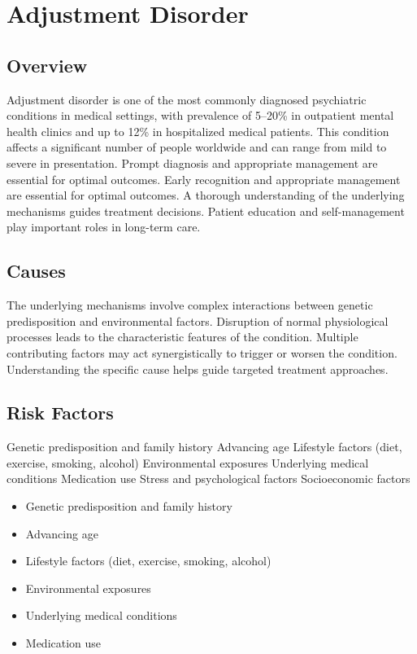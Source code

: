 \chapter{Adjustment Disorder}
\label{sec:Adjustment Disorder}

\section{Overview}
Adjustment disorder is one of the most commonly diagnosed psychiatric conditions in medical settings, with prevalence of 5--20\% in outpatient mental health clinics and up to 12\% in hospitalized medical patients. This condition affects a significant number of people worldwide and can range from mild to severe in presentation. Prompt diagnosis and appropriate management are essential for optimal outcomes. Early recognition and appropriate management are essential for optimal outcomes. A thorough understanding of the underlying mechanisms guides treatment decisions. Patient education and self-management play important roles in long-term care.
\section{Causes}
The underlying mechanisms involve complex interactions between genetic predisposition and environmental factors. Disruption of normal physiological processes leads to the characteristic features of the condition. Multiple contributing factors may act synergistically to trigger or worsen the condition. Understanding the specific cause helps guide targeted treatment approaches.
\section{Risk Factors}
Genetic predisposition and family history Advancing age Lifestyle factors (diet, exercise, smoking, alcohol) Environmental exposures Underlying medical conditions Medication use Stress and psychological factors Socioeconomic factors

\begin{itemize}[noitemsep]
  \item Genetic predisposition and family history
  \item Advancing age
  \item Lifestyle factors (diet, exercise, smoking, alcohol)
  \item Environmental exposures
  \item Underlying medical conditions
  \item Medication use
\end{itemize}
